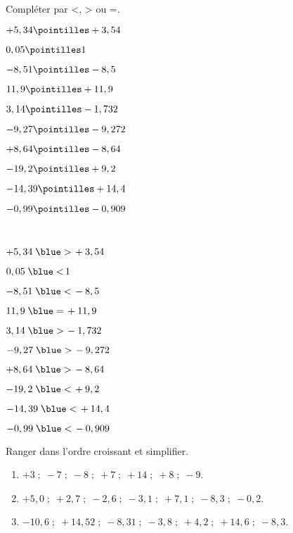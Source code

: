 \begin{colonne*exercice}
\medskip


\begin{exercice} %
   Compléter par <, > ou =.
   {\baselineskip=7mm
   \begin{colenumerate}{2} 
      \item $+5,34 \pointilles +3,54$
      \item $0,05 \pointilles 1$
      \item $-8,51 \pointilles -8,5$
      \item $11,9 \pointilles +11,9$
      \item $3,14 \pointilles -1,732$
      \item $-9,27 \pointilles -9,272$
      \item $+8,64 \pointilles -8,64$
      \item $-19,2 \pointilles +9,2$
      \item $-14,39 \pointilles +14,4$
      \item $-0,99 \pointilles -0,909$
   \end{colenumerate}}
\end{exercice}

\begin{corrige}
   \ \\ [-7mm]
   {\baselineskip=7mm
   \begin{colenumerate}{2}
      \item $+5,34 \; {\blue >} \, +3,54$
      \item $0,05 \; {\blue <} \, 1$
      \item $-8,51 \; {\blue <} \, -8,5$
      \item $11,9 \; {\blue =} \, +11,9$
      \item $3,14 \; {\blue >} \, -1,732$
      \item $-9,27 \; {\blue >} \, -9,272$
      \item $+8,64 \; {\blue >} \, -8,64$
      \item $-19,2 \; {\blue <} \, +9,2$
      \item $-14,39 \; {\blue <} \, +14,4$
      \item $-0,99 \; {\blue <} \, -0,909$
   \end{colenumerate}}
\end{corrige}

\medskip


\begin{exercice} %
   Ranger dans l'ordre croissant et simplifier.
   {\baselineskip=7mm
   \begin{enumerate}
      \item $+3 \; ; \; -7 \;;\;-8 \;;\; +7 \;; \;+14\; ;\; +8 \;;\; -9$.
      \item $+5,0\; ; \;+2,7 \;;\; -2,6\; ; \;-3,1\; ; \;+7,1\; ; \;-8,3\; ;\; -0,2$.
      \item $-10,6 \;; \;+14,52\; ;\; -8,31 \;; \;-3,8 \;; \;+4,2 \;; \;+14,6\; ;\; -8,3$.
   \end{enumerate}}  
\end{exercice}


\end{colonne*exercice}
